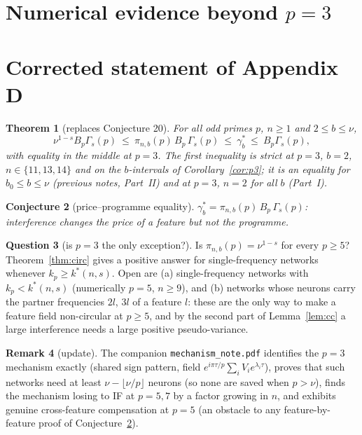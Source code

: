 \documentclass[11pt]{article}
\newtheorem{theorem}{Theorem}
\newtheorem{conjecture}[theorem]{Conjecture}
\theoremstyle{definition}
\newtheorem{remark}[theorem]{Remark}
\newtheorem{question}[theorem]{Question}
\begin{document}
\section{Numerical evidence beyond $p=3$}


\section{Corrected statement of Appendix D}
\begin{theorem}[replaces Conjecture 20]
For all odd primes $p$, $n\ge1$ and $2\le b\le\nu$,
\[
\nu^{1-s}B_p\Gamma_s(p)\ \le\ \pi_{n,b}(p)\,B_p\,\Gamma_s(p)\ \le\ \gamma^*_b\ \le\ B_p\Gamma_s(p),
\]
with equality in the middle at $p=3$.  The first inequality is strict at $p=3$, $b=2$, $n\in\{11,13,14\}$ and on the
$b$-intervals of Corollary~\ref{cor:p3}; it is an equality for $b_0\le b\le\nu$ (previous notes, Part~II) and at
$p=3$, $n=2$ for all $b$ (Part~I).
\end{theorem}

\begin{conjecture}[price--programme equality]\label{conj:pp}
$\gamma^*_b=\pi_{n,b}(p)\,B_p\,\Gamma_s(p)$: interference changes the price of a feature but not the programme.
\end{conjecture}

\begin{question}[is $p=3$ the only exception?]\label{q:p5}
Is $\pi_{n,b}(p)=\nu^{1-s}$ for every $p\ge5$?  Theorem~\ref{thm:circ} gives a positive answer for single-frequency
networks whenever $k_p\ge k^*(n,s)$.  Open are (a) single-frequency networks with $k_p<k^*(n,s)$ (numerically
$p=5$, $n\ge9$), and (b) networks whose neurons carry the partner frequencies $2l$, $3l$ of a feature $l$: these are the
only way to make a feature field non-circular at $p\ge5$, and by the second part of Lemma~\ref{lem:cc} a large
interference needs a large positive pseudo-variance.
\end{question}

\begin{remark}[update]
The companion \texttt{mechanism\_note.pdf} identifies the $p=3$ mechanism exactly (shared sign pattern, field
$e^{i\pi\tau/p}\sum_iV_ie^{\lambda_i\tau}$), proves that such networks need at least $\nu-\lfloor\nu/p\rfloor$ neurons (so
none are saved when $p>\nu$), finds the mechanism losing to IF at $p=5,7$ by a factor growing in $n$, and exhibits genuine
cross-feature compensation at $p=5$ (an obstacle to any feature-by-feature proof of Conjecture~\ref{conj:pp}).
\end{remark}
\end{document}
